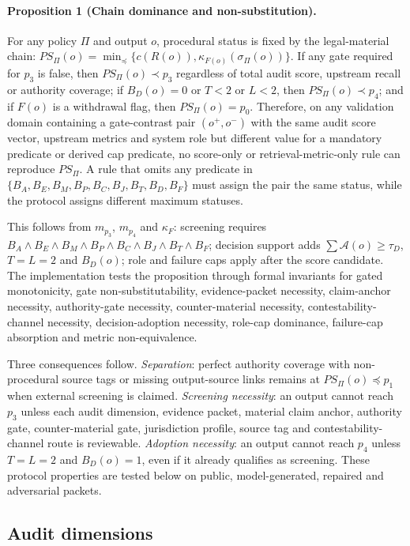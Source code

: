 \documentclass[12pt,a4paper]{article}
\begin{document}
\paragraph{Proposition 1 (Chain dominance and non-substitution).}
For any policy $\Pi$ and output $o$, procedural status is fixed by the legal-material chain: $PS_{\Pi}(o)=\min_{\preceq}\{c(R(o)),\kappa_{F(o)}(\sigma_{\Pi}(o))\}$. If any gate required for $p_3$ is false, then $PS_{\Pi}(o)\prec p_3$ regardless of total audit score, upstream recall or authority coverage; if $B_D(o)=0$ or $T<2$ or $L<2$, then $PS_{\Pi}(o)\prec p_4$; and if $F(o)$ is a withdrawal flag, then $PS_{\Pi}(o)=p_0$. Therefore, on any validation domain containing a gate-contrast pair $(o^+,o^-)$ with the same audit score vector, upstream metrics and system role but different value for a mandatory predicate or derived cap predicate, no score-only or retrieval-metric-only rule can reproduce $PS_{\Pi}$. A rule that omits any predicate in $\{B_A,B_E,B_M,B_P,B_C,B_J,B_T,B_D,B_F\}$ must assign the pair the same status, while the protocol assigns different maximum statuses.

This follows from $m_{p_3}$, $m_{p_4}$ and $\kappa_F$: screening requires $B_A\land B_E\land B_M\land B_P\land B_C\land B_J\land B_T\land B_F$; decision support adds $\sum\mathcal{A}(o)\geq\tau_D$, $T=L=2$ and $B_D(o)$; role and failure caps apply after the score candidate. The implementation tests the proposition through formal invariants for gated monotonicity, gate non-substitutability, evidence-packet necessity, claim-anchor necessity, authority-gate necessity, counter-material necessity, contestability-channel necessity, decision-adoption necessity, role-cap dominance, failure-cap absorption and metric non-equivalence.

Three consequences follow. \textit{Separation}: perfect authority coverage with non-procedural source tags or missing output-source links remains at $PS_{\Pi}(o)\preceq p_1$ when external screening is claimed. \textit{Screening necessity}: an output cannot reach $p_3$ unless each audit dimension, evidence packet, material claim anchor, authority gate, counter-material gate, jurisdiction profile, source tag and contestability-channel route is reviewable. \textit{Adoption necessity}: an output cannot reach $p_4$ unless $T=L=2$ and $B_D(o)=1$, even if it already qualifies as screening. These protocol properties are tested below on public, model-generated, repaired and adversarial packets.

\subsection{Audit dimensions}
\end{document}

